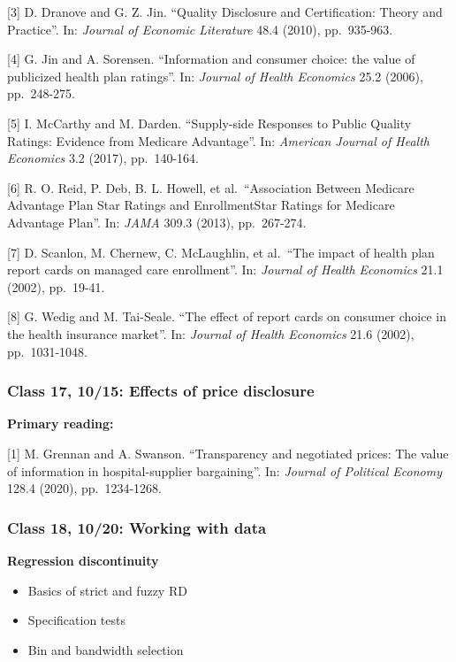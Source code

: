 \documentclass[11pt,]{article}
\providecommand{\tightlist}{%
  \setlength{\itemsep}{0pt}\setlength{\parskip}{0pt}}
\begin{document}
{[}3{]} D. Dranove and G. Z. Jin. ``Quality Disclosure and
Certification: Theory and Practice''. In: \emph{Journal of Economic
Literature} 48.4 (2010), pp.~935-963.

{[}4{]} G. Jin and A. Sorensen. ``Information and consumer choice: the
value of publicized health plan ratings''. In: \emph{Journal of Health
Economics} 25.2 (2006), pp.~248-275.

{[}5{]} I. McCarthy and M. Darden. ``Supply-side Responses to Public
Quality Ratings: Evidence from Medicare Advantage''. In: \emph{American
Journal of Health Economics} 3.2 (2017), pp.~140-164.

{[}6{]} R. O. Reid, P. Deb, B. L. Howell, et al.~``Association Between
Medicare Advantage Plan Star Ratings and EnrollmentStar Ratings for
Medicare Advantage Plan''. In: \emph{JAMA} 309.3 (2013), pp.~267-274.

{[}7{]} D. Scanlon, M. Chernew, C. McLaughlin, et al.~``The impact of
health plan report cards on managed care enrollment''. In: \emph{Journal
of Health Economics} 21.1 (2002), pp.~19-41.

{[}8{]} G. Wedig and M. Tai-Seale. ``The effect of report cards on
consumer choice in the health insurance market''. In: \emph{Journal of
Health Economics} 21.6 (2002), pp.~1031-1048.

\hypertarget{class-17-1015-effects-of-price-disclosure}{%
\subsubsection{Class 17, 10/15: Effects of price
disclosure}\label{class-17-1015-effects-of-price-disclosure}}

\textbf{Primary reading:}

{[}1{]} M. Grennan and A. Swanson. ``Transparency and negotiated prices:
The value of information in hospital-supplier bargaining''. In:
\emph{Journal of Political Economy} 128.4 (2020), pp.~1234-1268.

\hypertarget{class-18-1020-working-with-data}{%
\subsubsection{Class 18, 10/20: Working with
data}\label{class-18-1020-working-with-data}}

\textbf{Regression discontinuity}

\begin{itemize}
\tightlist
\item
  Basics of strict and fuzzy RD
\item
  Specification tests
\item
  Bin and bandwidth selection
\end{itemize}
\end{document}
